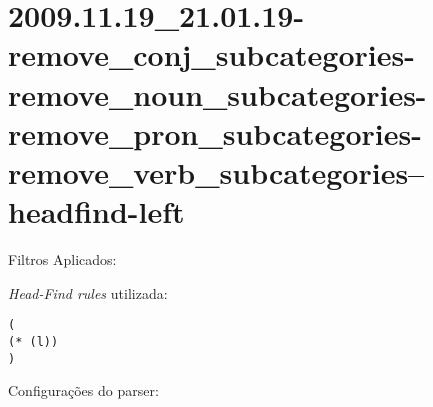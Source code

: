 \section{2009.11.19_21.01.19-remove_conj_subcategories-remove_noun_subcategories-remove_pron_subcategories-remove_verb_subcategories--headfind-left} %
\label{sec:exp:2009.11.19_21.01.19-remove_conj_subcategories-remove_noun_subcategories-remove_pron_subcategories-remove_verb_subcategories--headfind-left}

Filtros Aplicados:

\begin{itemize}
  
  \item{\emph{RemoveConjSubcategories}
  
  \item{\emph{RemoveNounSubcategories}
  
  \item{\emph{RemovePronSubcategories}
  
  \item{\emph{RemoveVerbSubcategories}
  
\end{itemize}

\emph{Head-Find rules} utilizada:

\scriptsize
\begin{verbatim}
(
(* (l))
)

\end{verbatim}

\normalsize

Configurações do parser:

